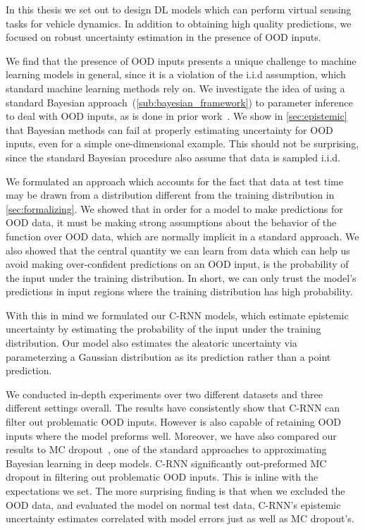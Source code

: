 \documentclass[../main.tex]{subfiles}
\begin{document}
In this thesis we set out to design DL models which can perform virtual sensing tasks for vehicle dynamics. In addition to obtaining high quality predictions, we focused on robust uncertainty  estimation in the presence of OOD inputs. 

We find that the presence of OOD inputs presents a unique challenge to machine learning models in general, since it is a violation of the i.i.d assumption, which standard machine learning methods rely on. We investigate the idea of using a standard Bayesian approach~(\cref{sub:bayesian_framework}) to parameter inference to deal with OOD inputs, as is done in prior work~\citep{kendall2017uncertainties}. We show in \cref{sec:epistemic} that Bayesian methods can fail at properly estimating uncertainty for OOD inputs, even for a simple one-dimensional example. This should not be surprising, since the standard Bayesian procedure also assume that data is sampled i.i.d. 

We formulated an approach which accounts for the fact that data at test time may be drawn from a distribution different from the training distribution in \cref{sec:formalizing}. We showed that in order for a model to make predictions for OOD data, it must be making strong assumptions about the behavior of the function over OOD data, which are normally implicit in a standard approach. We also showed that the central quantity we can learn from data which can help us avoid making over-confident predictions on an OOD input, is the probability of the input under the training distribution. In short, we can only trust the model's predictions in input regions where the training distribution has high probability. 

With this in mind we formulated our C-RNN models, which estimate epistemic uncertainty by estimating the probability of the input under the training distribution. Our model also estimates the aleatoric uncertainty via parameterzing a Gaussian distribution as its prediction rather than a point prediction.

We conducted in-depth experiments over two different datasets and three different settings overall. The results have consistently show that C-RNN can filter out problematic OOD inputs. However is also capable of retaining OOD inputs where the model preforms well. Moreover, we have also compared our results to MC dropout~\citep{gal2016dropout}, one of the standard approaches to approximating Bayesian learning in deep models. C-RNN significantly out-preformed MC dropout in filtering out problematic OOD inputs. This is inline with the expectations we set. The more surprising finding is that when we excluded the OOD data, and evaluated the model on normal test data, C-RNN's epistemic uncertainty estimates correlated with model errors just as well as MC dropout's. 
\end{document}
